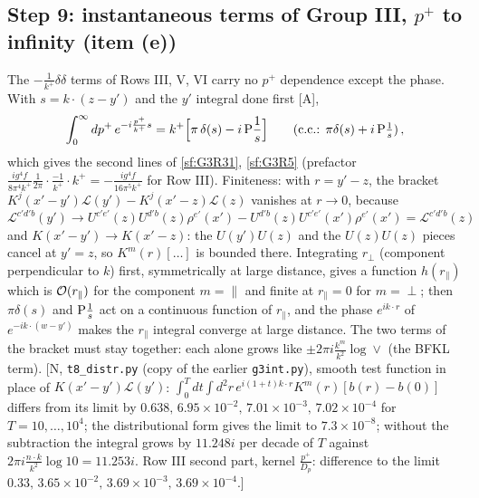 \subsection{Step 9: instantaneous terms of Group III, $p^{+}$ to infinity (item (e))}
\noindent The $-\frac{1}{k^{+}}\delta\delta$ terms of Rows III, V, VI carry no $p^{+}$ dependence except the phase. With $s=k\cdot(z-y')$ and the $y'$ integral done first [A],
\begin{align}
\int_{0}^{\infty}dp^{+}\,e^{-i\frac{p^{+}}{k^{+}}s}=k^{+}\Big[\pi\,\delta(s)-i\,{\rm P}\frac1s\Big]\qquad(\text{c.c.: }\pi\delta(s)+i\,{\rm P}\tfrac1s)\,,\label{sf:distr}
\end{align}
which gives the second lines of \eqref{sf:G3R31}, \eqref{sf:G3R5} (prefactor $\frac{ig^{4}f}{8\pi^{4}k^{+}}\frac{1}{2\pi}\cdot\frac{-1}{k^{+}}\cdot k^{+}=-\frac{ig^{4}f}{16\pi^{5}k^{+}}$ for Row III). Finiteness: with $r=y'-z$, the bracket $K^{j}(x'-y')\mathcal{L}(y')-K^{j}(x'-z)\mathcal{L}(z)$ vanishes at $r\to0$, because $\mathcal{L}^{c'd'b}(y')\to U^{c'e'}(z)U^{d'b}(z)\rho^{e'}(x')-U^{d'b}(z)U^{c'e'}(x')\rho^{e'}(x')=\mathcal{L}^{c'd'b}(z)$ and $K(x'-y')\to K(x'-z)$: the $U(y')U(z)$ and the $U(z)U(z)$ pieces cancel at $y'=z$, so $K^{m}(r)[\dots]$ is bounded there. Integrating $r_{\perp}$ (component perpendicular to $k$) first, symmetrically at large distance, gives a function $h(r_{\parallel})$ which is ${\cal O}(r_{\parallel})$ for the component $m=\parallel$ and finite at $r_{\parallel}=0$ for $m=\perp$; then $\pi\delta(s)$ and ${\rm P}\frac1s$ act on a continuous function of $r_{\parallel}$, and the phase $e^{ik\cdot r}$ of $e^{-ik\cdot(w-y')}$ makes the $r_{\parallel}$ integral converge at large distance. The two terms of the bracket must stay together: each alone grows like $\pm2\pi i\frac{k^{m}}{k^{2}}\log\vee$ (the BFKL term). [N, \texttt{t8\_distr.py} (copy of the earlier \texttt{g3int.py}), smooth test function in place of $K(x'-y')\mathcal{L}(y')$: $\int_{0}^{T}dt\int d^{2}r\,e^{i(1+t)k\cdot r}K^{m}(r)[b(r)-b(0)]$ differs from its limit by $0.638,\,6.95\times10^{-2},\,7.01\times10^{-3},\,7.02\times10^{-4}$ for $T=10,\dots,10^{4}$; the distributional form gives the limit to $7.3\times10^{-8}$; without the subtraction the integral grows by $11.248i$ per decade of $T$ against $2\pi i\frac{n\cdot k}{k^{2}}\log10=11.253i$. Row III second part, kernel $\frac{p^{+}}{D_{p}}$: difference to the limit $0.33,\,3.65\times10^{-2},\,3.69\times10^{-3},\,3.69\times10^{-4}$.]

